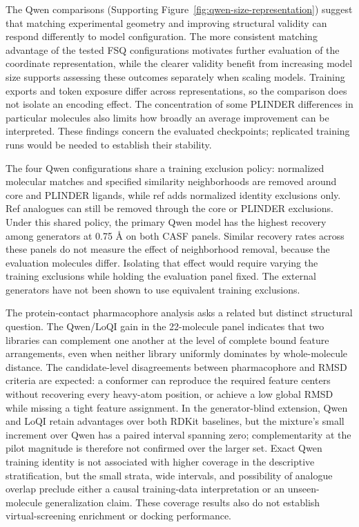 The Qwen comparisons (Supporting Figure~\ref{fig:qwen-size-representation}) suggest
that matching experimental geometry and improving structural
validity can respond differently to model configuration. The more consistent matching
advantage of the tested FSQ configurations motivates further evaluation of the coordinate
representation, while the clearer validity benefit from increasing model size supports
assessing these outcomes separately when scaling models. Training exports and token exposure
differ across representations, so the comparison does not isolate an encoding effect.
The concentration of some PLINDER differences in particular molecules also limits how broadly
an average improvement can be interpreted. These findings concern the evaluated checkpoints;
replicated training runs would be needed to establish their stability.

The four Qwen configurations share a training exclusion policy: normalized molecular
matches and specified similarity neighborhoods are removed around core and PLINDER
ligands, while ref adds normalized identity exclusions only. Ref analogues can still
be removed through the core or PLINDER exclusions. Under this shared policy, the
primary Qwen model has the highest recovery among generators at 0.75 \AA{} on both
CASF panels. Similar recovery rates across these panels do not measure the effect of
neighborhood removal, because the evaluation molecules differ. Isolating that effect
would require varying the training exclusions while holding the evaluation panel fixed.
The external generators have not been shown to use equivalent training exclusions.

The protein-contact pharmacophore analysis asks a related but distinct structural
question. The Qwen/LoQI gain in the 22-molecule panel indicates that two libraries
can complement one another at the level of complete bound feature arrangements,
even when neither library uniformly dominates by whole-molecule distance. The
candidate-level disagreements between pharmacophore and RMSD criteria are expected:
a conformer can reproduce the required feature centers without recovering every
heavy-atom position, or achieve a low global RMSD while missing a tight feature
assignment. In the generator-blind extension, Qwen and LoQI retain advantages over
both RDKit baselines, but the mixture's small increment over Qwen has a paired
interval spanning zero; complementarity at the pilot magnitude is therefore not
confirmed over the larger set. Exact Qwen training identity is not associated with
higher coverage in the descriptive stratification, but the small strata, wide
intervals, and possibility of analogue overlap preclude either a causal training-data
interpretation or an unseen-molecule generalization claim. These coverage results
also do not establish virtual-screening enrichment or docking performance.

